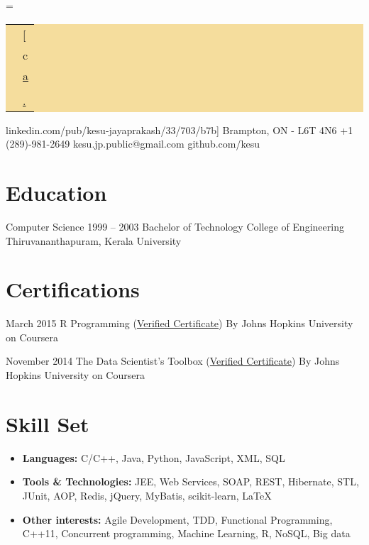 \documentclass{tccv}
\renewcommand\personal[5][]{%
    \needspace{0.5\textheight}%
    \newdimen\boxwidth%
    \boxwidth=\dimexpr\linewidth-2\fboxsep\relax%
    \colorbox[HTML]{F5DD9D}{%
    \begin{tabularx}{\boxwidth}{c|X}
    \Writinghand & {#2}\smallskip\\
    \Telefon     & {#3}\smallskip\\
    \Letter      & \href{mailto:#4}{#4}
    \ifstrempty{#1}{}{\smallskip\\ \Lightning & \href{http://#1}{#1}}
    \ifstrempty{#5}{}{\smallskip\\ \Lightning & \href{http://#5}{#5}}
    \end{tabularx}}}
\begin{document}
\personal
    [ca.linkedin.com/pub/kesu-jayaprakash/33/703/b7b]
    {Brampton, ON - L6T 4N6}
    {+1 (289)-981-2649}
    {kesu.jp.public@gmail.com}
    {github.com/kesu}

\section{Education}

\begin{yearlist}

\item[Computer Science]{1999 -- 2003}
     {Bachelor of Technology}
     {College of Engineering Thiruvananthapuram, Kerala University}
\end{yearlist}

\section{Certifications}

\begin{yearlist}

\item{March 2015}
     {R Programming (\href{https://www.coursera.org/account/accomplishments/certificate/ZNR9NY3SSH}{Verified Certificate})}
     {By Johns Hopkins University on Coursera}

\item{November 2014}
     {The Data Scientist's Toolbox (\href{https://www.coursera.org/account/accomplishments/certificate/745X8Z7SQJ}{Verified Certificate})}
     {By Johns Hopkins University on Coursera}

\end{yearlist}


\section{Skill Set}
{\begin{itemize}
\item
    {\textbf{Languages:} C/C++, Java, Python, JavaScript, XML, SQL}
\item
    {\textbf{Tools \& Technologies:} JEE, Web Services, SOAP, REST, Hibernate, STL, JUnit, AOP, Redis, jQuery, MyBatis, scikit-learn, \LaTeX}
\item
    {\textbf{Other interests:} Agile Development, TDD, Functional Programming, C++11, Concurrent programming, Machine Learning, R, NoSQL, Big data}
\end{itemize}}
\end{document}

